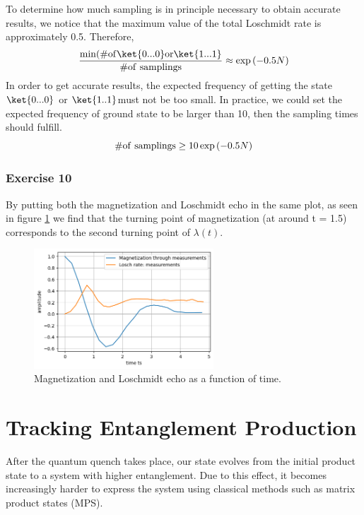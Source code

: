 To determine how much sampling is in principle necessary to obtain accurate results, we notice that the maximum value of the total Loschmidt rate is approximately 0.5. Therefore,
\begin{equation}
    \frac{\min(\#\yx{of} \ket{0...0} \yx{or}\ket{1...1}}{\#\yx{of~samplings}} \approx \exp\left(-0.5N\right)
\end{equation}
In order to get accurate results, the expected frequency of getting the state $\ket{0...0}$ or $\ket{1..1}$must not be too small. In practice, we could set the expected frequency of ground state to be larger than 10, then the sampling times should fulfill.
\begin{equation}
    \#\mathrm{of~samplings} \geq 10\exp\left(-0.5N\right)
\end{equation}

\subsubsection{Exercise 10}
By putting both the magnetization and Loschmidt echo in the same plot, as seen in figure \ref{fig:MagAndLosch} we find that the turning point of magnetization (at around t = 1.5) corresponds to the second turning point of $\lambda(t)$.
\begin{figure}[h]
    \centering
    \includegraphics[width= 0.6\textwidth]{tex/figures/MagAndLosch.png}
    \caption{Magnetization and Loschmidt echo as a function of time.}
    \label{fig:MagAndLosch}
\end{figure}

\section{Tracking Entanglement Production}

After the quantum quench takes place, our state evolves from the initial product state to a system with higher entanglement. Due to this effect, it becomes increasingly harder to express the system using classical methods such as matrix product states (MPS).

